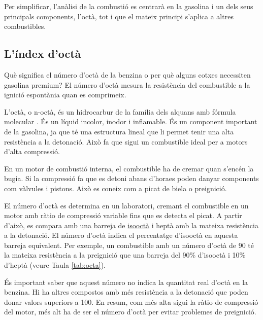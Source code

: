Per simplificar, l'anàlisi de la combustió es centrarà en la gasolina i un dels seus principals components, l'octà, tot i que el mateix principi s'aplica a altres combustibles.

\subsection{L'índex d'octà}

    Què significa el número d'octà de la benzina o per què alguns cotxes necessiten gasolina premium? El número d'octà mesura la resistència del combustible a la ignició espontània quan es comprimeix.

    L'octà, o n-octà, és un hidrocarbur de la família dels alquans amb fórmula molecular . És un líquid incolor, inodor i inflamable. És un component important de la gasolina, ja que té una estructura lineal que li permet tenir una alta resistència a la detonació. Això fa que sigui un combustible ideal per a motors d'alta compressió.

En un motor de combustió interna, el combustible ha de cremar quan s'encén la bugia. Si la compressió fa que es detoni abans d'horaes poden danyar components com vàlvules i pistons. Això es coneix com a picat de biela o preignició.

El número d'octà es determina en un laboratori, cremant el combustible en un motor amb ràtio de compressió variable fins que es detecta el picat. A partir d'això, es compara amb una barreja de \href{https://www.ebi.ac.uk/chebi/searchId.do?printerFriendlyView=true&chebiId=62805&structureView=applet}{isooctà} i heptà amb la mateixa resistència a la detonació. El número d'octà indica el percentatge d'isooctà en aquesta barreja equivalent. Per exemple, un combustible amb un número d'octà de 90 té la mateixa resistència a la preignició que una barreja del 90\% d'isooctà i 10\% d'heptà (veure Taula \ref{tab:octa}).

És important saber que aquest número no indica la quantitat real d'octà en la benzina. Hi ha altres compostos amb més resistència a la detonació que poden donar valors superiors a 100. En resum, com més alta sigui la ràtio de compressió del motor, més alt ha de ser el número d'octà per evitar problemes de preignició.  
 
